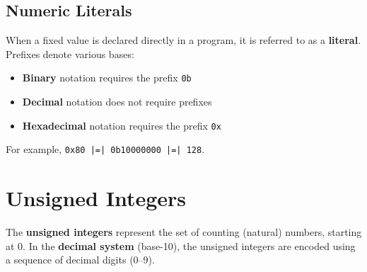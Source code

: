 \documentclass{report}
\begin{document}
\subsection{Numeric Literals}
When a fixed value is declared directly in a program, it is referred to as a \textbf{literal}.
Prefixes denote various bases:
\begin{itemize}
    \item \textbf{Binary} notation requires the prefix \texttt{0b}
    \item \textbf{Decimal} notation does not require prefixes
    \item \textbf{Hexadecimal} notation requires the prefix \texttt{0x}
\end{itemize}
For example, \texttt{0x80 |=| 0b10000000 |=| 128}. %
\section{Unsigned Integers}
The \textbf{unsigned integers} represent the set of counting (natural) numbers, starting at 0.
In the \textbf{decimal system} (base-10), the unsigned integers are encoded using a sequence of decimal digits (0--9).
\end{document}

